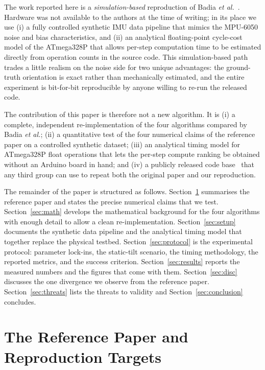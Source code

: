 \documentclass[conference]{IEEEtran}
\begin{document}
The work reported here is a \emph{simulation-based} reproduction
of Badia \textit{et al.}~\cite{badia2023}. Hardware was not
available to the authors at the time of writing; in its place we
use (i) a fully controlled synthetic IMU data pipeline that mimics
the MPU-6050 noise and bias characteristics, and (ii) an
analytical floating-point cycle-cost model of the ATmega328P that
allows per-step computation time to be estimated directly from
operation counts in the source code. This simulation-based path
trades a little realism on the noise side for two unique
advantages: the ground-truth orientation is exact rather than
mechanically estimated, and the entire experiment is bit-for-bit
reproducible by anyone willing to re-run the released code.

The contribution of this paper is therefore not a new algorithm.
It is (i) a complete, independent re-implementation of the four
algorithms compared by Badia \textit{et al.}; (ii) a quantitative
test of the four numerical claims of the reference paper on a
controlled synthetic dataset; (iii) an analytical timing model for
ATmega328P float operations that lets the per-step compute
ranking be obtained without an Arduino board in hand; and
(iv) a publicly released code base~\cite{ourcode} that any third
group can use to repeat both the original paper and our
reproduction.

The remainder of the paper is structured as follows.
Section~\ref{sec:refpaper} summarises the reference paper and
states the precise numerical claims that we test.
Section~\ref{sec:math} develops the mathematical background for the
four algorithms with enough detail to allow a clean
re-implementation.
Section~\ref{sec:setup} documents the synthetic data pipeline and
the analytical timing model that together replace the physical
testbed.
Section~\ref{sec:protocol} is the experimental protocol:
parameter lock-ins, the static-tilt scenario, the timing
methodology, the reported metrics, and the success criterion.
Section~\ref{sec:results} reports the measured numbers and the
figures that come with them.
Section~\ref{sec:disc} discusses the one divergence we observe
from the reference paper.
Section~\ref{sec:threats} lists the threats to validity and
Section~\ref{sec:conclusion} concludes.

\section{The Reference Paper and Reproduction Targets}\label{sec:refpaper}
\end{document}
